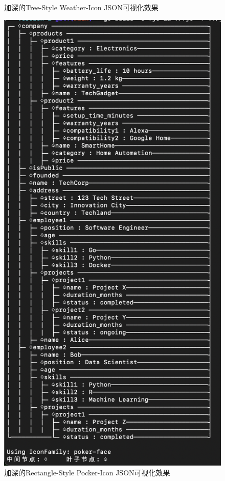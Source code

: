 \documentclass[hyperref,a4paper,UTF8]{ctexart}
\begin{document}
\begin{figure}[htbp]
\begin{minipage}[t]{0.42\textwidth}
    \caption{加深的Tree-Style Weather-Icon JSON可视化效果}
    \label{fig:deep-tre}
\end{minipage}
\hfill
\begin{minipage}[t]{0.48\textwidth}
    \centering
    \includegraphics[width=\textwidth]{figures/deep-rec.png}
    \caption{加深的Rectangle-Style Pocker-Icon JSON可视化效果}
    \label{fig:deep-rec}
\end{minipage}
\end{figure}





\end{document}
